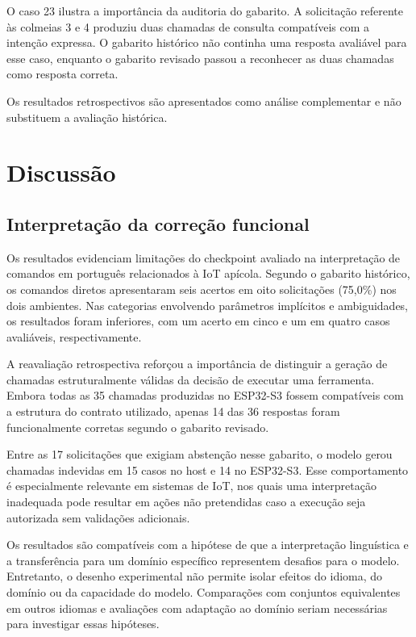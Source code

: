 \documentclass[12pt]{article}
\begin{document}
O caso 23 ilustra a importância da
auditoria do gabarito. A solicitação
referente às colmeias 3 e 4 produziu
duas chamadas de consulta compatíveis
com a intenção expressa. O gabarito
histórico não continha uma resposta
avaliável para esse caso, enquanto o
gabarito revisado passou a reconhecer
as duas chamadas como resposta correta.

Os resultados retrospectivos são
apresentados como análise complementar
e não substituem a avaliação histórica.


\section{Discussão}
\label{sec:discussao}

\subsection{Interpretação da correção funcional}

Os resultados evidenciam limitações do checkpoint avaliado
na interpretação de comandos em português relacionados à
IoT apícola. Segundo o gabarito histórico, os comandos
diretos apresentaram seis acertos em oito solicitações
(75,0\%) nos dois ambientes. Nas categorias envolvendo
parâmetros implícitos e ambiguidades, os resultados foram
inferiores, com um acerto em cinco e um em quatro casos
avaliáveis, respectivamente.

A reavaliação retrospectiva reforçou a importância de
distinguir a geração de chamadas estruturalmente válidas
da decisão de executar uma ferramenta. Embora todas as
35 chamadas produzidas no ESP32-S3 fossem compatíveis
com a estrutura do contrato utilizado, apenas 14 das
36 respostas foram funcionalmente corretas segundo o
gabarito revisado.

Entre as 17 solicitações que exigiam abstenção nesse
gabarito, o modelo gerou chamadas indevidas em 15 casos
no host e 14 no ESP32-S3. Esse comportamento é
especialmente relevante em sistemas de IoT, nos quais
uma interpretação inadequada pode resultar em ações
não pretendidas caso a execução seja autorizada
sem validações adicionais.

Os resultados são compatíveis com a hipótese de que
a interpretação linguística e a transferência para
um domínio específico representem desafios para o
modelo. Entretanto, o desenho experimental não
permite isolar efeitos do idioma, do domínio ou da
capacidade do modelo. Comparações com conjuntos
equivalentes em outros idiomas e avaliações com
adaptação ao domínio seriam necessárias para
investigar essas hipóteses.
\end{document}
